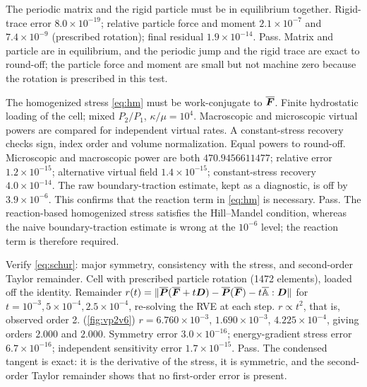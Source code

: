 \taim The periodic matrix and the rigid particle must be in equilibrium together.
\trun {}
\tobtain Rigid-trace error $8.0\times10^{-19}$; relative particle force and moment
$2.1\times10^{-7}$ and $7.4\times10^{-9}$ (prescribed rotation); final residual
$1.9\times10^{-14}$. Pass.
\tinfer Matrix and particle are in equilibrium, and the periodic jump and the rigid trace are exact to round-off; the particle force and moment are small but not machine zero because the rotation is prescribed in this test.

\taim The homogenized stress \cref{eq:hm} must be work-conjugate to $\overline{\bm F}$.
\tsetup Finite hydrostatic loading of the cell; mixed $P_2/P_1$, $\kappa/\mu=10^4$.
Macroscopic and microscopic virtual powers are compared for independent virtual
rates. A constant-stress recovery checks sign, index order and volume
normalization.
\trun {}
\texpect Equal powers to round-off.
\tobtain Microscopic and macroscopic power are both $470.9456611477$; relative error
$1.2\times10^{-15}$; alternative virtual field $1.4\times10^{-15}$; constant-stress
recovery $4.0\times10^{-14}$. The raw boundary-traction estimate, kept as a
diagnostic, is off by $3.9\times10^{-6}$. This confirms that the reaction term in
\cref{eq:hm} is necessary. Pass.
\tinfer The reaction-based homogenized stress satisfies the Hill--Mandel condition, whereas the naive boundary-traction estimate is wrong at the $10^{-6}$ level; the reaction term is therefore required.

\taim Verify \cref{eq:schur}: major symmetry, consistency with the stress, and
second-order Taylor remainder.
\tsetup Cell with prescribed particle rotation (1472 elements), loaded off the
identity. Remainder $r(t)=\|\overline{\bm P}(\overline{\bm F}+t\bm D)-\overline{\bm P}(\overline{\bm F})-t\overline{\mathbb A}:\bm D\|$ for
$t=10^{-3},5\times10^{-4},2.5\times10^{-4}$, re-solving the RVE at each step.
\trun {}
\texpect $r\propto t^2$, that is, observed order 2.
\tobtain (\cref{fig:vp2v6}) $r=6.760\times10^{-3}$, $1.690\times10^{-3}$, $4.225\times10^{-4}$, giving
orders $2.000$ and $2.000$. Symmetry error $3.0\times10^{-16}$; energy-gradient
stress error $6.7\times10^{-16}$; independent sensitivity error
$1.7\times10^{-15}$. Pass.
\tinfer The condensed tangent is exact: it is the derivative of the stress, it is symmetric, and the second-order Taylor remainder shows that no first-order error is present.

